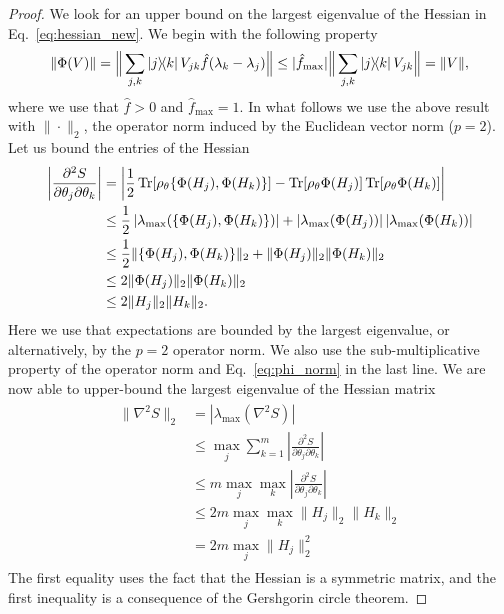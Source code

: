 \documentclass[
    reprint,
    aps,
    prx,
    longbibliography
]{revtex4-2}
\begin{document}
\begin{proof}
We look for an upper bound on the largest eigenvalue of the Hessian in Eq.~\eqref{eq:hessian_new}. 
We begin with the following property
\begin{align}
\label{eq:phi_norm}
    \| \Phi(V) \| = \Big \| \sum_{j,k} \ketbra{j}{k} V_{jk} \hat{f}(\lambda_k - \lambda_j) \Big \| \leq | \hat{f}_{\max} | \Big \| \sum_{j,k} \ketbra{j}{k} V_{jk} \Big \| = \| V \| ,
\end{align}
where we use that $\hat{f}>0$ and $\hat{f}_{\max} = 1$. In what follows we use the above result with $\| \cdot \|_2$, the operator norm induced by the Euclidean vector norm ($p=2$). 
Let us bound the entries of the Hessian
\begin{align}
\begin{split}
    \left| \frac{\partial^2 S}{\partial \theta_{j} \partial \theta_{k}} \right| &= \left | \frac{1}{2} \Tr[ \rho_\theta \{ \Phi(H_j), \Phi(H_k) \}] - \Tr[ \rho_\theta \Phi(H_j)] \Tr[ \rho_\theta \Phi(H_k)] \right| \\
    &\leq \frac{1}{2}  \left | \lambda_{\max}( \{ \Phi(H_j), \Phi(H_k) \} ) \right| + \left | \lambda_{\max}( \Phi(H_j) ) \right|  \left | \lambda_{\max} ( \Phi(H_k) ) \right| \\
    &\leq \frac{1}{2} \| \{\Phi(H_j), \Phi(H_k)\} \|_2 +  \| \Phi(H_j) \|_2 \| \Phi(H_k) \|_2 \\ 
    &\leq 2 \| \Phi(H_j) \|_2 \| \Phi(H_k) \|_2 \\
    &\leq 2 \| H_j \|_2 \| H_k \|_2 .
\end{split}
\end{align}
Here we use that expectations are bounded by the largest eigenvalue, or alternatively, by the $p=2$ operator norm. We also use the sub-multiplicative property of the operator norm and Eq.~\eqref{eq:phi_norm} in the last line. 
We are now able to upper-bound the largest eigenvalue of the Hessian matrix
\begin{align}
\begin{split}
\label{eq:hess_upper_bound}
\| \nabla^2 S \|_2 &= | \lambda_\mathrm{max}(\nabla^2 S)| \\
&\leq \max_j \sum_{k=1}^m  \left| \frac{\partial^2 S}{\partial \theta_{j} \partial \theta_{k}} \right| \\
&\leq m \max_j \max_k  \left| \frac{\partial^2 S}{\partial \theta_{j} \partial \theta_{k}} \right| \\
&\leq 2m \max_j \max_k \| H_j \|_2 \| H_k \|_2 \\
&= 2 m \max_j \| H_j \|_2^2
\end{split}
\end{align}
The first equality uses the fact that the Hessian is a symmetric matrix, and the first inequality is a consequence of the Gershgorin circle theorem.


\end{proof}
\end{document}
